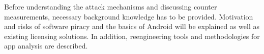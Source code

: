 Before understanding the attack mechanisms and discussing counter measurements, necessary background knowledge has to be provided.
Motivation and risks of software piracy and the basics of Android will be explained as well as existing licensing solutions. In addition, reengineering tools and methodologies for app analysis are described.
